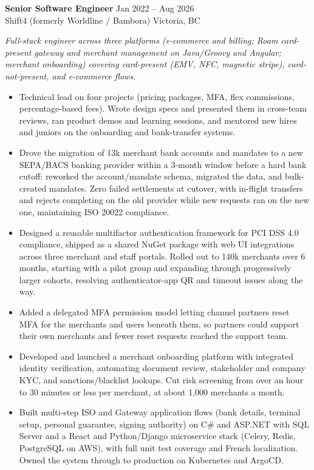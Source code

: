\documentclass[10.5pt]{article}
\newcommand{\jobheader}[4]{%
  \needspace{6\baselineskip}%
  \vspace{7pt}
  \textbf{#1} \hfill {\color{accentlight}\small #2}\\
  {\small\color{textgray!80} #3} \hfill {\small\color{textgray!80} #4}\\[-2pt]%
}
\begin{document}
\jobheader{Senior Software Engineer}{Jan 2022 -- Aug 2026}{Shift4 (formerly Worldline / Bambora)}{Victoria, BC}
{\small\color{textgray!80}\textit{Full-stack engineer across three platforms (e-commerce and billing; Roam card-present gateway and merchant management on Java/Groovy and Angular; merchant onboarding) covering card-present (EMV, NFC, magnetic stripe), card-not-present, and e-commerce flows.}\par}
\begin{itemize}
  \item Technical lead on four projects (pricing packages, MFA, flex commissions, percentage-based fees). Wrote design specs and presented them in cross-team reviews, ran product demos and learning sessions, and mentored new hires and juniors on the onboarding and bank-transfer systems.
  \item Drove the migration of 13k merchant bank accounts and mandates to a new SEPA/BACS banking provider within a 3-month window before a hard bank cutoff: reworked the account/mandate schema, migrated the data, and bulk-created mandates. Zero failed settlements at cutover, with in-flight transfers and rejects completing on the old provider while new requests ran on the new one, maintaining ISO 20022 compliance.
  \item Designed a reusable multifactor authentication framework for PCI DSS 4.0 compliance, shipped as a shared NuGet package with web UI integrations across three merchant and staff portals. Rolled out to 140k merchants over 6 months, starting with a pilot group and expanding through progressively larger cohorts, resolving authenticator-app QR and timeout issues along the way.
  \item Added a delegated MFA permission model letting channel partners reset MFA for the merchants and users beneath them, so partners could support their own merchants and fewer reset requests reached the support team.
  \item Developed and launched a merchant onboarding platform with integrated identity verification, automating document review, stakeholder and company KYC, and sanctions/blacklist lookups. Cut risk screening from over an hour to 30 minutes or less per merchant, at about 1,000 merchants a month.
  \item Built multi-step ISO and Gateway application flows (bank details, terminal setup, personal guarantee, signing authority) on C\# and ASP.NET with SQL Server and a React and Python/Django microservice stack (Celery, Redis, PostgreSQL on AWS), with full unit test coverage and French localization. Owned the system through to production on Kubernetes and ArgoCD.

\end{itemize}
\end{document}
